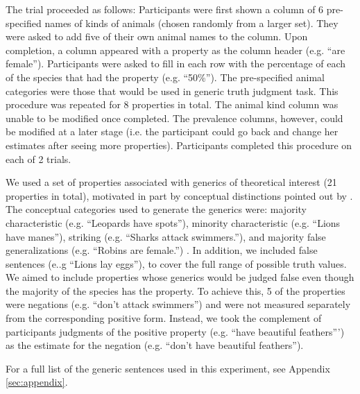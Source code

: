 \documentclass[10pt,letterpaper]{article}
\begin{document}
The trial proceeded as follows:
Participants were first shown a column of 6 pre-specified names of kinds of animals (chosen randomly from a larger set). 
They were asked to add five of their own animal names to the column. 
Upon completion, a column appeared with a property as the column header (e.g. ``are female'').
Participants were asked to fill in each row with the percentage of each of the  species that had the property (e.g. ``50\%'').
The pre-specified animal categories were those that would be used in generic truth judgment task.
This procedure was repeated for 8 properties in total. 
The animal kind column was unable to be modified once completed. 
The prevalence columns, however, could be modified at a later stage (i.e. the participant could go back and change her estimates after seeing more properties). 
Participants completed this procedure on each of 2 trials.


We used a set of properties associated with generics of theoretical interest (21 properties in total), motivated in part by conceptual distinctions pointed out by . 
The conceptual categories used to generate the generics were: majority characteristic (e.g. ``Leopards have spots''), minority characteristic (e.g. ``Lions have manes''), striking (e.g. ``Sharks attack swimmers.''), and majority false generalizations (e.g. ``Robins are female.'') \cite{Prasada2013}. 
In addition, we included false sentences (e..g ``Lions lay eggs''), to cover the full range of possible truth values.
We aimed to include properties whose generics would be judged false even though the majority of the species has the property. To achieve this, 5 of the properties were negations (e.g. ``don't attack swimmers'') and were not measured separately from the corresponding positive form. 
Instead, we took the complement of participants judgments of the positive property (e.g. ``have beautiful feathers''') as the estimate for the negation (e.g. ``don't have beautiful feathers'').

For a full list of the generic sentences used in this experiment, see Appendix \ref{sec:appendix}.
\end{document}
